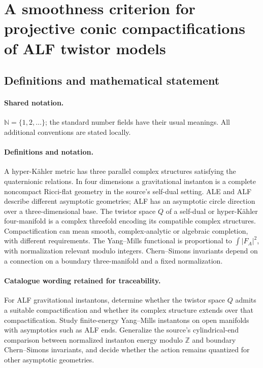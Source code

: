 \documentclass[11pt]{article}
\begin{document}
\section{A smoothness criterion for projective conic compactifications of ALF twistor models}\label{statement}

\subsection{Definitions and mathematical statement}

\paragraph{Shared notation.}$\mathbb N=\{1,2,\ldots\}$; the standard number fields have their usual meanings. All additional conventions are stated locally.


\paragraph{Definitions and notation.}A hyper-Kähler metric has three parallel complex structures satisfying the quaternionic relations. In four dimensions a gravitational instanton is a complete noncompact Ricci-flat geometry in the source’s self-dual setting. ALE and ALF describe different asymptotic geometries; ALF has an asymptotic circle direction over a three-dimensional base. The twistor space $Q$ of a self-dual or hyper-Kähler four-manifold is a complex threefold encoding its compatible complex structures. Compactification can mean smooth, complex-analytic or algebraic completion, with different requirements. The Yang--Mills functional is proportional to $\int|F_A|^2$, with normalization relevant modulo integers. Chern--Simons invariants depend on a connection on a boundary three-manifold and a fixed normalization.

\paragraph{Catalogue wording retained for traceability.}
For ALF gravitational instantons, determine whether the twistor space $Q$ admits a suitable compactification and whether its complex structure extends over that compactification. Study finite-energy Yang--Mills instantons on open manifolds with asymptotics such as ALF ends. Generalize the source’s cylindrical-end comparison between normalized instanton energy modulo $\mathbb Z$ and boundary Chern--Simons invariants, and decide whether the action remains quantized for other asymptotic geometries.
\end{document}
